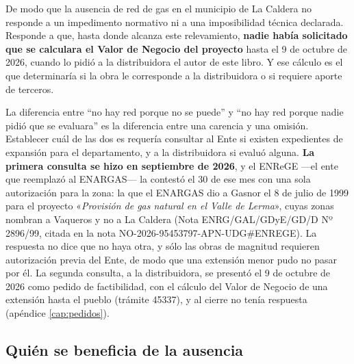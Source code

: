 De modo que la ausencia de red de gas en el municipio de La Caldera no responde a un impedimento normativo ni a una imposibilidad técnica declarada. Responde a que, hasta donde alcanza este relevamiento, \textbf{nadie había solicitado que se calculara el Valor de Negocio del proyecto} hasta el 9 de octubre de 2026, cuando lo pidió a la distribuidora el autor de este libro. Y ese cálculo es el que determinaría si la obra le corresponde a la distribuidora o si requiere aporte de terceros.

La diferencia entre ``no hay red porque no se puede'' y ``no hay red porque nadie pidió que se evaluara'' es la diferencia entre una carencia y una omisión. Establecer cuál de las dos es requería consultar al Ente si existen expedientes de expansión para el departamento, y a la distribuidora si evaluó alguna. \textbf{La primera consulta se hizo en septiembre de 2026}, y el ENReGE ---el ente que reemplazó al ENARGAS--- la contestó el 30 de ese mes con una sola autorización para la zona: la que el ENARGAS dio a Gasnor el 8 de julio de 1999 para el proyecto «\textit{Provisión de gas natural en el Valle de Lerma}», cuyas zonas nombran a Vaqueros y no a La Caldera (Nota ENRG/GAL/GDyE/GD/D Nº 2896/99, citada en la nota NO-2026-95453797-APN-UDG\#ENREGE). La respuesta no dice que no haya otra, y sólo las obras de magnitud requieren autorización previa del Ente, de modo que una extensión menor pudo no pasar por él. La segunda consulta, a la distribuidora, se presentó el 9 de octubre de 2026 como pedido de factibilidad, con el cálculo del Valor de Negocio de una extensión hasta el pueblo (trámite 45337), y al cierre no tenía respuesta (apéndice \ref{cap:pedidos}).

\subsection*{Quién se beneficia de la ausencia}


